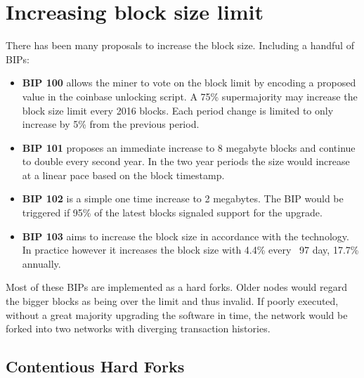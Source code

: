 

\section{Increasing block size limit}

There has been many proposals to increase the block size. Including a handful of BIPs:

\begin{itemize}
	
	\item \textbf{BIP 100} allows the miner to vote on the block limit by encoding a proposed value in the coinbase unlocking script. A 75\% supermajority may increase the block size limit every 2016 blocks. Each period change is limited to only increase by 5\% from the previous period.\cite{bip:0100:dynamic:block:size}
	
	\item \textbf{BIP 101} proposes an immediate increase to 8 megabyte blocks and continue to double every second year. In the two year periods the size would increase at a linear pace based on the block timestamp.\cite{bip:0101:increase:block:size}
	
	\item \textbf{BIP 102} is a simple one time increase to 2 megabytes. The BIP would be triggered if 95\% of the latest blocks signaled support for the upgrade.\cite{bip:0102:increase:2mb}
	
	\item \textbf{BIP 103} aims to increase the block size in accordance with the technology. In practice however it increases the block size with 4.4\% every ~97 day, 17.7\% annually. \cite{bip:0103:increase:with:technology}
\end{itemize}

Most of these BIPs are implemented as a hard forks. Older nodes would regard the bigger blocks as being over the limit and thus invalid.
If poorly executed, without a great majority upgrading the software in time, the network would be forked into two networks with diverging transaction histories. 

\subsection{Contentious Hard Forks}

